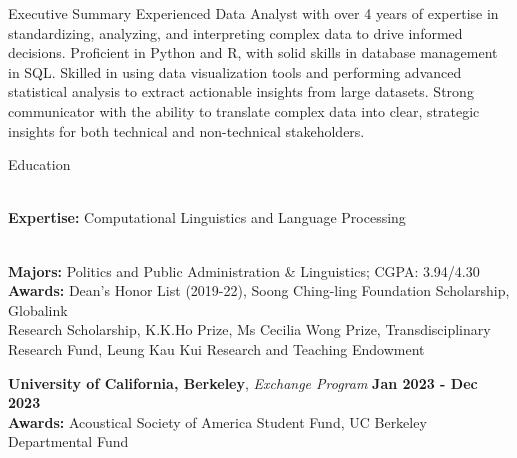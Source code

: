 \documentclass{resume} %
\begin{document}
 \begin{rSection}{Executive Summary}
   Experienced Data Analyst with over 4 years of expertise in standardizing, analyzing, and interpreting complex data to drive informed decisions. Proficient in Python and R, with solid skills in database management in SQL. Skilled in using data visualization tools and performing advanced statistical analysis to extract actionable insights from large datasets. Strong communicator with the ability to translate complex data into clear, strategic insights for both technical and non-technical stakeholders.

   \end{rSection}
\begin{rSection}{Education}

\\
\textbf{Expertise:} Computational Linguistics and Language Processing\hfill {}

\\
\textbf{Majors:} Politics and Public Administration \& Linguistics; {CGPA: 3.94/4.30} \\
\textbf{Awards:} Dean's Honor List (2019-22), Soong Ching-ling Foundation Scholarship, Globalink \\  
\phantom{Awards: } Research Scholarship, K.K.Ho Prize, Ms Cecilia Wong Prize, Transdisciplinary \\ \phantom{Awards: } Research Fund, Leung Kau Kui Research and Teaching Endowment

\textbf{University of California, Berkeley}, \textit{Exchange Program}  \hfill \textbf{Jan 2023 - Dec 2023}\\
\textbf{Awards:} Acoustical Society of America Student Fund, UC Berkeley Departmental Fund

\end{rSection}
\end{document}
